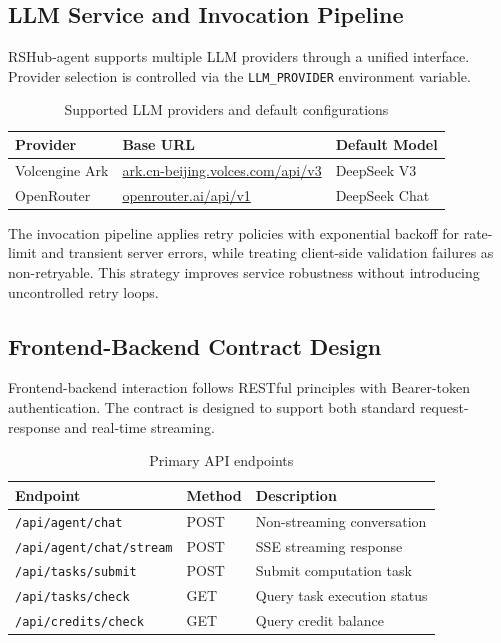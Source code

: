\subsection{LLM Service and Invocation Pipeline}
RSHub-agent supports multiple LLM providers through a unified interface. Provider selection is controlled via the \texttt{LLM\_PROVIDER} environment variable.

\begin{table}[htbp]
	\centering
	\caption{Supported LLM providers and default configurations}
	\label{tab:llm_providers}
	\begin{tabular}{lll}
		\toprule
		\textbf{Provider} & \textbf{Base URL} & \textbf{Default Model} \\
		\midrule
		Volcengine Ark & \url{ark.cn-beijing.volces.com/api/v3} & DeepSeek V3 \\
		OpenRouter & \url{openrouter.ai/api/v1} & DeepSeek Chat \\
		\bottomrule
	\end{tabular}
\end{table}

The invocation pipeline applies retry policies with exponential backoff for rate-limit and transient server errors, while treating client-side validation failures as non-retryable. This strategy improves service robustness without introducing uncontrolled retry loops.

\subsection{Frontend-Backend Contract Design}
Frontend-backend interaction follows RESTful principles with Bearer-token authentication. The contract is designed to support both standard request-response and real-time streaming.

\begin{table}[htbp]
	\centering
	\caption{Primary API endpoints}
	\label{tab:api_endpoints}
	\begin{tabular}{llp{6cm}}
		\toprule
		\textbf{Endpoint} & \textbf{Method} & \textbf{Description} \\
		\midrule
		\texttt{/api/agent/chat} & POST & Non-streaming conversation \\
		\texttt{/api/agent/chat/stream} & POST & SSE streaming response \\
		\texttt{/api/tasks/submit} & POST & Submit computation task \\
		\texttt{/api/tasks/check} & GET & Query task execution status \\
		\texttt{/api/credits/check} & GET & Query credit balance \\
		\bottomrule
	\end{tabular}
\end{table}

